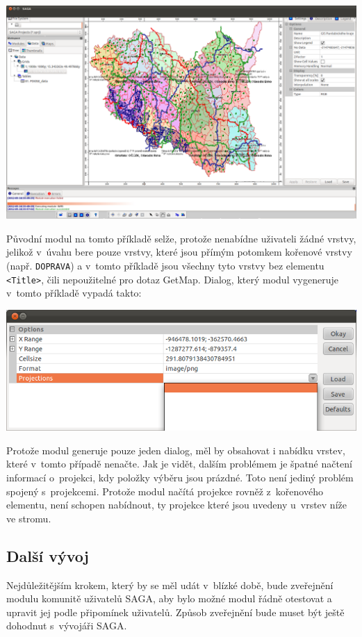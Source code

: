 \documentclass[a4paper,12pt]{article}
\begin{document}
 \includegraphics[scale=0.25]{figures/SAGA_okno4.png}
 
 

Původní modul na tomto příkladě selže, protože nenabídne uživateli 
žádné vrstvy, jelikož v~úvahu bere pouze vrstvy, které jsou 
přímým potomkem kořenové vrstvy (např. {\tt DOPRAVA}) a v~tomto příkladě 
jsou všechny tyto vrstvy 
bez elementu {\tt <Title>}, čili nepoužitelné pro dotaz GetMap. 
Dialog, který modul vygeneruje v~tomto příkladě vypadá takto:

 \includegraphics[scale=0.5]{figures/SAGA_puvodni_modul.png}
 
Protože modul generuje pouze jeden dialog, měl by obsahovat i 
nabídku vrstev, které v~tomto případě nenačte. Jak je vidět,
dalším problémem je špatné načtení informací o~projekci, kdy 
položky výběru jsou prázdné. 
Toto není jediný problém  spojený s~projekcemi. Protože modul načítá 
projekce rovněž z~kořenového elementu, není schopen nabídnout, ty projekce 
které jsou uvedeny u~vrstev níže ve stromu. 

\subsection{Další vývoj}

Nejdůležitějším krokem, který by se měl udát v~blízké době, bude
zveřejnění modulu komunitě uživatelů SAGA, aby bylo
možné modul řádně otestovat a upravit jej podle připomínek
uživatelů. Způsob zveřejnění bude muset být ještě dohodnut s~vývojáři
SAGA.
\end{document}
